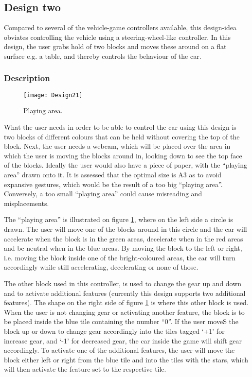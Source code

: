 \subsection{Design two}
\label{design2}
Compared to several of the vehicle-game controllers available, this design-idea obviates controlling the vehicle using a steering-wheel-like controller. In this design, the user grabs hold of two blocks and moves these around on a flat surface e.g. a table, and thereby controls the behaviour of the car.

\subsubsection*{Description}

\begin{figure}[!htbp]
\centering
\texttt{[image: Design21]}
\caption{Playing area.}
\label{fig:design21}
\end{figure}

What the user needs in order to be able to control the car using this design is two blocks of different colours that can be held without covering the top of the block. Next, the user needs a webcam, which will be placed over the area in which the user is moving the blocks around in, looking down to see the top face of the blocks. Ideally the user would also have a piece of paper, with the “playing area” drawn onto it. It is assessed that the optimal size is A3 as to avoid expansive gestures, which would be the result of a too big “playing area”. Conversely, a too small “playing area” could cause misreading and misplacements.
\bigskip

The “playing area” is illustrated on figure \ref{fig:design21}, where on the left side a circle is drawn. The user will move one of the blocks around in this circle and the car will accelerate when the block is in the green areas, decelerate when in the red areas and be neutral when in the blue areas. By moving the block to the left or right, i.e. moving the block inside one of the bright-coloured areas, the car will turn accordingly while still accelerating, decelerating or none of those.

The other block used in this controller, is used to change the gear up and down and to activate additional features (currently this design supports two additional features). The shape on the right side of figure \ref{fig:design21} is where this other block is used. When the user is not changing gear or activating another feature, the block is to be placed inside the blue tile containing the number “0”. If the user moveS the block up or down to change gear accordingly into the tiles tagged ‘+1’ for increase gear, and ‘-1’ for decreased gear, the car inside the game will shift gear accordingly. To activate one of the additional features, the user will move the block either left or right from the blue tile and into the tiles with the stars, which will then activate the feature set to the respective tile.

